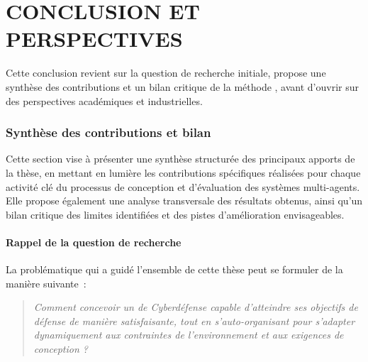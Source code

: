\clearpage
\thispagestyle{empty}
\null
\newpage

\cleardoublepage
{}
\part*{CONCLUSION ET PERSPECTIVES}
\label{part:conclusion}

\clearpage
\thispagestyle{empty}
\null
\newpage


\noindent
Cette conclusion revient sur la question de recherche initiale, propose une synthèse des contributions et un bilan critique de la méthode , avant d’ouvrir sur des perspectives académiques et industrielles.

\section*{Synthèse des contributions et bilan}
\label{sec:synthese_bilan}

\noindent
Cette section vise à présenter une synthèse structurée des principaux apports de la thèse, en mettant en lumière les contributions spécifiques réalisées pour chaque activité clé du processus de conception et d’évaluation des systèmes multi-agents. Elle propose également une analyse transversale des résultats obtenus, ainsi qu’un bilan critique des limites identifiées et des pistes d’amélioration envisageables.

\subsection*{Rappel de la question de recherche}

\noindent
La problématique qui a guidé l’ensemble de cette thèse peut se formuler de la manière suivante~:

\begin{quote}
  \emph{Comment concevoir un  de Cyberdéfense capable d'atteindre ses objectifs de défense de manière satisfaisante, tout en s'auto-organisant pour s'adapter dynamiquement aux contraintes de l'environnement et aux exigences de conception ?}
\end{quote}

